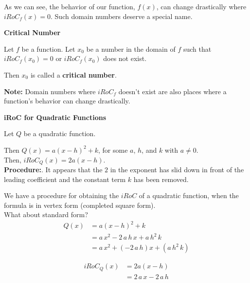 \documentclass{ximera}
\begin{document}
As we can see, the behavior of our function, $f(x)$, can change drastically where $iRoC_f(x) = 0$.  Such domain numbers deserve a special name.



\begin{definition} \textbf{\textcolor{green!50!black}{Critical Number}}  


Let $f$ be a function. Let $x_0$ be a number in the domain of $f$ such that $iRoC_f(x_0) = 0$ or $iRoC_f(x_0)$ does not exist.

Then $x_0$ is called a \textbf{critical number}.


\end{definition}
\textbf{Note: } Domain numbers where $iRoC_f$ doesn't exist are also places where a function's behavior can change drastically.



\begin{procedure} \textbf{\textcolor{blue!75!black}{iRoC for Quadratic Functions}} 



Let $Q$ be a quadratic function.

Then $Q(x) = a (x - h)^2 + k$, for some $a$, $h$, and $k$ with $a \ne 0$. \\

Then, $iRoC_Q(x) = 2 a (x - h)$. \\


\textbf{Procedure:}. It appears that the $2$ in the exponent has slid down in front of the leading coefficient and the constant term $k$ has been removed.



\end{procedure}



We have a procedure for obtaining the $iRoC$ of a quadratic function, when the formula is in vertex form (completed square form). \\

What about standard form? \\



\begin{align*}
Q(x) & = a (x - h)^2 + k \\
     & = a \, x^2 - 2 \, a \, h \, x + a \, h^2 \, k \\
     & = a \, x^2  + (- 2 \, a \, h) x + (a \, h^2 \, k) 
\end{align*}


\begin{align*}
iRoC_Q(x) &= 2 a (x - h) \\
          & = 2 \, a \, x - 2 \, a \, h  \\
\end{align*}
\end{document}

